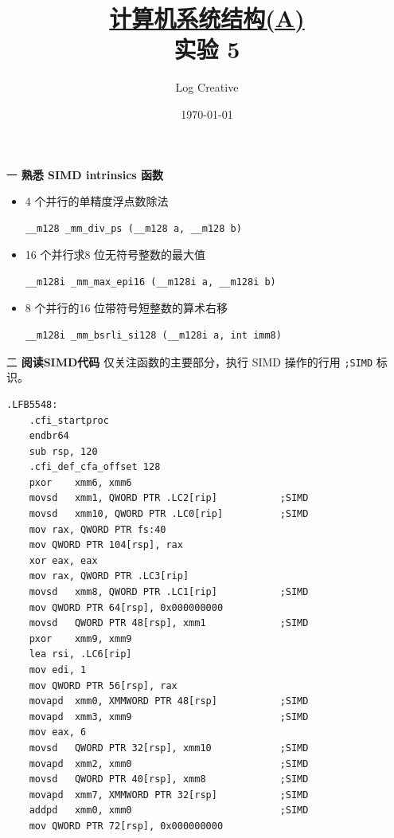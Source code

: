 \documentclass[12pt,a4paper]{article}
\newenvironment{problems}{\begin{list}{}{\renewcommand{\makelabel}[1]{\textbf{##1}.\hfil}}}{\end{list}}
\begin{document}
\title{\normalsize \underline{计算机系统结构(A)}\\\LARGE 实验 5}
\author{Log Creative }
\date{\today}
\maketitle

\begin{problems}
    \item[一] \textbf{熟悉 SIMD intrinsics 函数}
    \begin{itemize}
        \item 4 个并行的单精度浮点数除法
        \begin{lstlisting}[identifierstyle=\color{blue}]
            __m128 _mm_div_ps (__m128 a, __m128 b)
        \end{lstlisting}
        \item 16 个并行求8 位无符号整数的最大值
        \begin{lstlisting}[identifierstyle=\color{blue}]
            __m128i _mm_max_epi16 (__m128i a, __m128i b)
        \end{lstlisting}
        \item 8 个并行的16 位带符号短整数的算术右移
        \begin{lstlisting}[identifierstyle=\color{blue}]
            __m128i _mm_bsrli_si128 (__m128i a, int imm8)
        \end{lstlisting}
    \end{itemize}
    \item[二] \textbf{阅读SIMD代码}
    仅关注函数的主要部分，执行 SIMD 操作的行用 \verb";SIMD" 标识。
    \lstset{language=[x86masm]Assembler}
	\begin{multicols}{2}
		\begin{lstlisting}
.LFB5548:
	.cfi_startproc
	endbr64
	sub	rsp, 120
	.cfi_def_cfa_offset 128
	pxor	xmm6, xmm6
	movsd	xmm1, QWORD PTR .LC2[rip]			;SIMD
	movsd	xmm10, QWORD PTR .LC0[rip]			;SIMD
	mov	rax, QWORD PTR fs:40
	mov	QWORD PTR 104[rsp], rax
	xor	eax, eax
	mov	rax, QWORD PTR .LC3[rip]
	movsd	xmm8, QWORD PTR .LC1[rip]			;SIMD
	mov	QWORD PTR 64[rsp], 0x000000000
	movsd	QWORD PTR 48[rsp], xmm1				;SIMD
	pxor	xmm9, xmm9
	lea	rsi, .LC6[rip]
	mov	edi, 1
	mov	QWORD PTR 56[rsp], rax
	movapd	xmm0, XMMWORD PTR 48[rsp]			;SIMD
	movapd	xmm3, xmm9							;SIMD
	mov	eax, 6
	movsd	QWORD PTR 32[rsp], xmm10			;SIMD
	movapd	xmm2, xmm0							;SIMD
	movsd	QWORD PTR 40[rsp], xmm8				;SIMD
	movapd	xmm7, XMMWORD PTR 32[rsp]			;SIMD
	addpd	xmm0, xmm0							;SIMD
	mov	QWORD PTR 72[rsp], 0x000000000

\end{lstlisting}
\end{multicols}
\end{problems}
\end{document}
